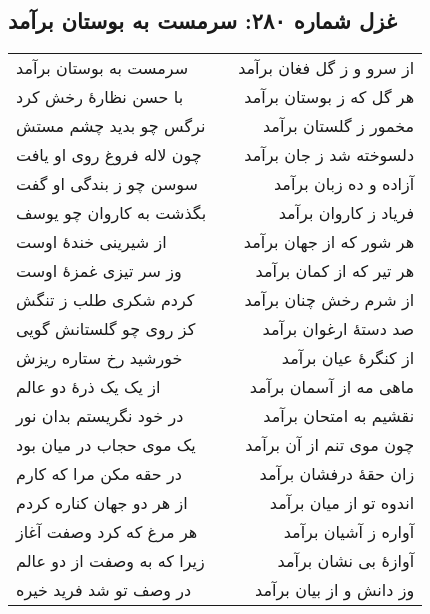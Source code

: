 \begin{center}
\section*{غزل شماره ۲۸۰: سرمست به بوستان برآمد}
\label{sec:280}
\begin{longtable}{l p{0.5cm} r}
سرمست به بوستان برآمد
&&
از سرو و ز گل فغان برآمد
\\
با حسن نظارهٔ رخش کرد
&&
هر گل که ز بوستان برآمد
\\
نرگس چو بدید چشم مستش
&&
مخمور ز گلستان برآمد
\\
چون لاله فروغ روی او یافت
&&
دلسوخته شد ز جان برآمد
\\
سوسن چو ز بندگی او گفت
&&
آزاده و ده زبان برآمد
\\
بگذشت به کاروان چو یوسف
&&
فریاد ز کاروان برآمد
\\
از شیرینی خندهٔ اوست
&&
هر شور که از جهان برآمد
\\
وز سر تیزی غمزهٔ اوست
&&
هر تیر که از کمان برآمد
\\
کردم شکری طلب ز تنگش
&&
از شرم رخش چنان برآمد
\\
کز روی چو گلستانش گویی
&&
صد دستهٔ ارغوان برآمد
\\
خورشید رخ ستاره ریزش
&&
از کنگرهٔ عیان برآمد
\\
از یک یک ذرهٔ دو عالم
&&
ماهی مه از آسمان برآمد
\\
در خود نگریستم بدان نور
&&
نقشیم به امتحان برآمد
\\
یک موی حجاب در میان بود
&&
چون موی تنم از آن برآمد
\\
در حقه مکن مرا که کارم
&&
زان حقهٔ درفشان برآمد
\\
از هر دو جهان کناره کردم
&&
اندوه تو از میان برآمد
\\
هر مرغ که کرد وصفت آغاز
&&
آواره ز آشیان برآمد
\\
زیرا که به وصفت از دو عالم
&&
آوازهٔ بی نشان برآمد
\\
در وصف تو شد فرید خیره
&&
وز دانش و از بیان برآمد
\\
\end{longtable}
\end{center}
